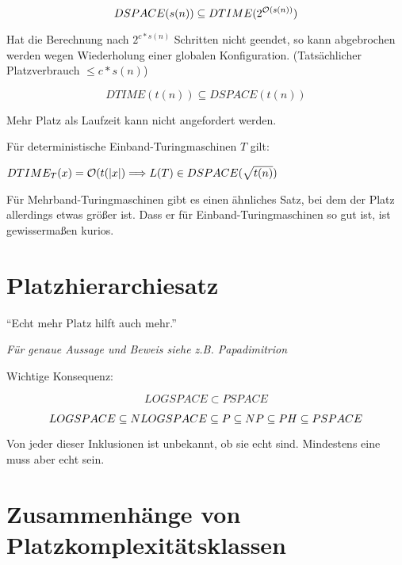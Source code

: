 $$ DSPACE(s(n)) \subseteq DTIME (2^{\mathcal{O}(s(n))}) $$

Hat die Berechnung nach $2^{c*s(n)}$ Schritten nicht geendet, so kann abgebrochen werden wegen Wiederholung einer globalen Konfiguration. (Tatsächlicher Platzverbrauch $\leq c * s(n)$)



$$ DTIME(t(n)) \subseteq DSPACE (t(n)) $$

Mehr Platz als Laufzeit kann nicht angefordert werden.





\begin{satz}

    Für deterministische Einband-Turingmaschinen $T$ gilt:

    $DTIME_T(x) = \mathcal{O}(t(|x|) \Longrightarrow  L(T) \in DSPACE(\sqrt{t(n)})$

    
\end{satz}

Für Mehrband-Turingmaschinen gibt es einen ähnliches Satz, bei dem der Platz allerdings etwas größer ist. Dass er für Einband-Turingmaschinen so gut ist, ist gewissermaßen kurios.





\section{Platzhierarchiesatz}

\begin{satz}
    
    ``Echt mehr Platz hilft auch mehr.''

    \textit{Für genaue Aussage und Beweis siehe z.B. Papadimitrion}
\end{satz}

Wichtige Konsequenz:

$$ LOGSPACE \subset PSPACE $$

$$ LOGSPACE \subseteq NLOGSPACE \subseteq P \subseteq NP \subseteq PH \subseteq PSPACE $$

Von jeder dieser Inklusionen ist unbekannt, ob sie echt sind. Mindestens eine muss aber echt sein.






\section{Zusammenhänge von Platzkomplexitätsklassen}


